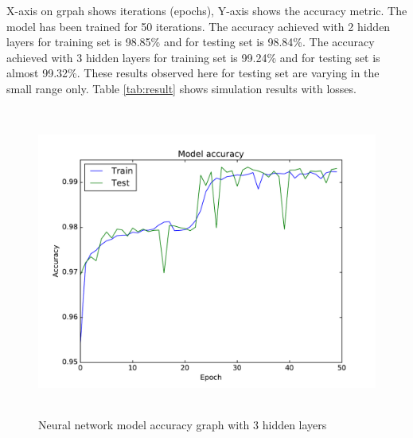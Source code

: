 \begin{table}[bp!]
\centering
\caption{Neural network model results.}
\label{tab:result}
\end{table}
\par
X-axis on grpah shows iterations (epochs), Y-axis shows the accuracy metric. The model has been trained for 50 iterations. The accuracy achieved with 2 hidden layers for training set is 98.85\% and for testing set is 98.84\%. The accuracy achieved with 3 hidden layers for training set is 99.24\% and for testing set is almost 99.32\%. These results observed here for testing set are varying in the small range only. Table \ref{tab:result} shows simulation results with losses.
\begin{figure}[h]
    \centering
    \includegraphics[width=5.5in, height=4in] {Figures/PDF/3hidden.pdf}
    \caption{Neural network model accuracy graph with 3 hidden layers}
    \label{3hidden}
\end{figure}

